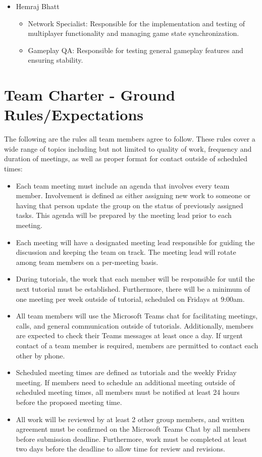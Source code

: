 \documentclass{article}
\begin{document}
\begin{itemize}
	\item Hemraj Bhatt
	\begin{itemize}
		\item Network Specialist: Responsible for the implementation and testing of multiplayer functionality and managing game state synchronization.
		\item Gameplay QA: Responsible for testing general gameplay features and ensuring stability.
	\end{itemize}	
	
\end{itemize}

\newpage
\section{Team Charter - Ground Rules/Expectations}

The following are the rules all team members agree to follow. These rules cover a wide range of topics including but not limited to quality of work, frequency and duration of meetings, as well as proper format for contact outside of scheduled times:

\begin{itemize}
	\item Each team meeting must include an agenda that involves every team member. Involvement is defined as either assigning new work to someone or having that person update the group on the status of previously assigned tasks. This agenda will be prepared by the meeting lead prior to each meeting.
	\item Each meeting will have a designated meeting lead responsible for guiding the discussion and keeping the team on track. The meeting lead will rotate among team members on a per-meeting basis.
	\item During tutorials, the work that each member will be responsible for until the next tutorial must be established. Furthermore, there will be a minimum of one meeting per week outside of tutorial, scheduled on Fridays at 9:00am.
	\item All team members will use the Microsoft Teams chat for facilitating meetings, calls, and general communication outside of tutorials. Additionally, members are expected to check their Teams messages at least once a day. If urgent contact of a team member is required, members are permitted to contact each other by phone.
	\item Scheduled meeting times are defined as tutorials and the weekly Friday meeting. If members need to schedule an additional meeting outside of scheduled meeting times, all members must be notified at least 24 hours before the proposed meeting time.
	\item All work will be reviewed by at least 2 other group members, and written agreement must be confirmed on the Microsoft Teams Chat by all members before submission deadline. Furthermore, work must be completed at least two days before the deadline to allow time for review and revisions.
\end{itemize}
\end{document}
